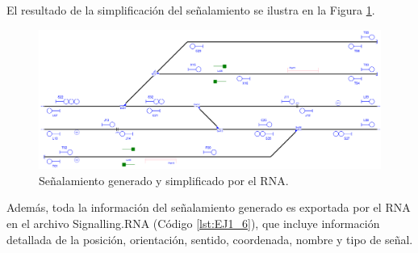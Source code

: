 	El resultado de la simplificación del señalamiento se ilustra en la Figura \ref{fig:EJ9_7}.
	
	\begin{figure}[H]
		\centering
		\includegraphics[width=1\textwidth]{resultados-obtenidos/ejemplo1/images/1_RNA.png}
		\centering\caption{Señalamiento generado y simplificado por el RNA.}
		\label{fig:EJ9_7}
	\end{figure}
	
	Además, toda la información del señalamiento generado es exportada por el RNA en el archivo Signalling.RNA (Código \ref{lst:EJ1_6}), que incluye información detallada de la posición, orientación, sentido, coordenada, nombre y tipo de señal.
	
